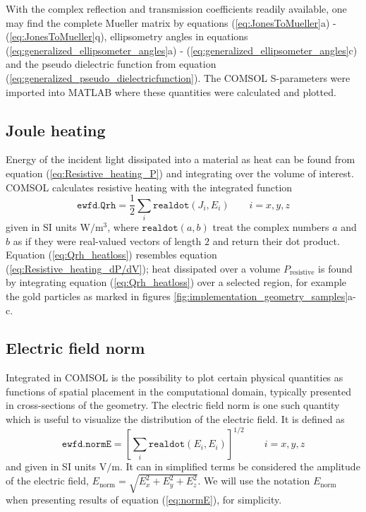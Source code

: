 With the complex reflection and transmission coefficients readily available, one may find the complete Mueller matrix by equations (\ref{eq:JonesToMueller}a) - (\ref{eq:JonesToMueller}q), ellipsometry angles in equations (\ref{eq:generalized_ellipsometer_angles}a) - (\ref{eq:generalized_ellipsometer_angles}c) and the pseudo dielectric function from equation (\ref{eq:generalized_pseudo_dielectricfunction}). The COMSOL S-parameters were imported into MATLAB where these quantities were calculated and plotted.

\subsection{Joule heating}
Energy of the incident light dissipated into a material as heat can be found from equation (\ref{eq:Resistive_heating_P}) and integrating over the volume of interest. COMSOL calculates resistive heating with the integrated function 
\begin{equation}
    \texttt{ewfd.Qrh} = \frac{1}{2}\sum_i \texttt{realdot}(J_i,E_i) \quad\quad i=x,y,z
    \label{eq:Qrh_heatloss}
\end{equation}
given in SI units W$/$m$^3$, where $\texttt{realdot}(a,b)$ treat the complex numbers $a$ and $b$ as if they were real-valued vectors of length $2$ and return their dot product\cite{comsol_referencemanual}. Equation (\ref{eq:Qrh_heatloss}) resembles equation (\ref{eq:Resistive_heating_dP/dV}); heat dissipated over a volume $P_{\text{resistive}}$ is found by integrating equation (\ref{eq:Qrh_heatloss}) over a selected region, for example the gold particles as marked in figures \ref{fig:implementation_geometry_samples}a-c.

\subsection{Electric field norm}
Integrated in COMSOL is the possibility to plot certain physical quantities as functions of spatial placement in the computational domain, typically presented in cross-sections of the geometry. The electric field norm is one such quantity which is useful to visualize the distribution of the electric field. It is defined as
\begin{equation}
    \texttt{ewfd.normE} = \left [ \sum_i \texttt{realdot}(E_i,E_i) \right ]^{1/2} \quad\quad i=x,y,z
    \label{eq:normE}
\end{equation}
and given in SI units V$/$m. It can in simplified terms be considered the amplitude of the electric field, $E_\text{norm}=\sqrt{E_x^2+E_y^2+E_z^2}$. We will use the notation $E_\text{norm}$ when presenting results of equation (\ref{eq:normE}), for simplicity.
